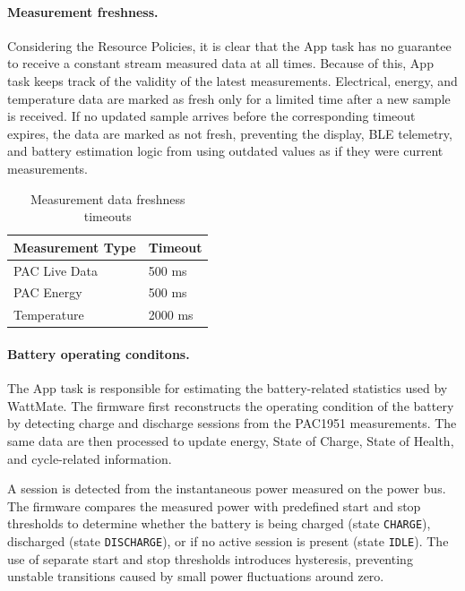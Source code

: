 \begin{itemize}
\end{itemize}

\paragraph{Measurement freshness.}
Considering the Resource Policies, it is clear that the App task has no guarantee to receive a constant stream measured data at all times. Because of this, App task keeps track of the validity of the latest measurements. Electrical, energy, and temperature data are marked as fresh only for a limited time after a new sample is received. If no updated sample arrives before the corresponding timeout expires, the data are marked as not fresh, preventing the display, BLE telemetry, and battery estimation logic from using outdated values as if they were current measurements.

\begin{table}[H]
	\centering
	\small
	\caption{Measurement data freshness timeouts}
	\label{tab:data_freshness}
	\begin{tabular}{ll}
		\toprule
		\textbf{Measurement Type} & \textbf{Timeout} \\
		\midrule
		PAC Live Data  & 500 ms  \\
		PAC Energy     & 500 ms  \\
		Temperature    & 2000 ms \\
		\bottomrule
	\end{tabular}
\end{table}

\paragraph{Battery operating conditons.}
The App task is responsible for estimating the battery-related statistics used by WattMate. The firmware first reconstructs the operating condition of the battery by detecting charge and discharge sessions from the PAC1951 measurements. The same data are then processed to update energy, State of Charge, State of Health, and cycle-related information.

A session is detected from the instantaneous power measured on the power bus. The firmware compares the measured power with predefined start and stop thresholds to determine whether the battery is being charged (state \texttt{CHARGE}), discharged (state \texttt{DISCHARGE}), or if no active session is present (state \texttt{IDLE}). The use of separate start and stop thresholds introduces hysteresis, preventing unstable transitions caused by small power fluctuations around zero.

